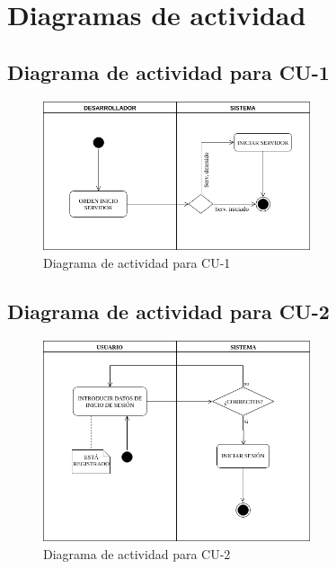 \section {Diagramas de actividad}

\subsection{Diagrama de actividad para CU-1 }
\begin{figure}[H]
  \begin{center}
    \includegraphics[width=0.7\textwidth]{imagenes/DA-CU-1.png}
    \caption{Diagrama de actividad para CU-1}
    \label{fig:DA-CU-1}
  \end{center}
\end{figure}
\subsection{Diagrama de actividad para CU-2 }
\begin{figure}[H]
  \begin{center}
    \includegraphics[width=0.7\textwidth]{imagenes/DA-CU-2.png}
    \caption{Diagrama de actividad para CU-2}
    \label{fig:DA-CU-2}
  \end{center}
\end{figure}
